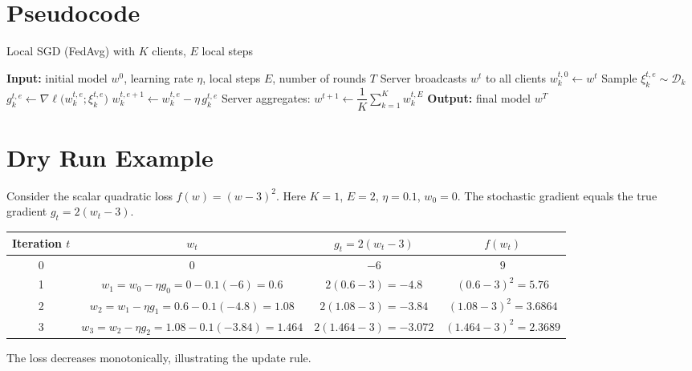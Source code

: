 \documentclass{article}
\begin{document}
\section*{Pseudocode}
\begin{algorithm}[H]
\caption{Local SGD (FedAvg) with $K$ clients, $E$ local steps}
\begin{algorithmic}[1]
\State \textbf{Input:} initial model $w^{0}$, learning rate $\eta$, local steps $E$, number of rounds $T$
    \State Server broadcasts $w^{t}$ to all clients
        \State $w_{k}^{t,0}\gets w^{t}$
            \State Sample $\xi_{k}^{t,e}\sim\mathcal{D}_{k}$
            \State $g_{k}^{t,e}\gets \nabla\ell\big(w_{k}^{t,e};\xi_{k}^{t,e}\big)$
            \State $w_{k}^{t,e+1}\gets w_{k}^{t,e} - \eta\, g_{k}^{t,e}$
        \EndFor
    \EndFor
    \State Server aggregates: $w^{t+1}\gets \dfrac1K\sum_{k=1}^{K} w_{k}^{t,E}$
\EndFor
\State \textbf{Output:} final model $w^{T}$
\end{algorithmic}
\end{algorithm}

\section*{Dry Run Example}
Consider the scalar quadratic loss $f(w)=(w-3)^2$.
Here $K=1$, $E=2$, $\eta=0.1$, $w_0=0$.
The stochastic gradient equals the true gradient $g_t=2(w_t-3)$.

\begin{center}
\begin{tabular}{c|c|c|c}
Iteration $t$ & $w_t$ & $g_t=2(w_t-3)$ & $f(w_t)$\\ \hline
0 & $0$ & $-6$ & $9$\\
1 & $w_1 = w_0 - \eta g_0 = 0 -0.1(-6)=0.6$ & $2(0.6-3)=-4.8$ & $(0.6-3)^2=5.76$\\
2 & $w_2 = w_1 - \eta g_1 = 0.6 -0.1(-4.8)=1.08$ & $2(1.08-3)=-3.84$ & $(1.08-3)^2=3.6864$\\
3 & $w_3 = w_2 - \eta g_2 = 1.08 -0.1(-3.84)=1.464$ & $2(1.464-3)=-3.072$ & $(1.464-3)^2=2.3689$\\
\end{tabular}
\end{center}
The loss decreases monotonically, illustrating the update rule.

\end{document}
